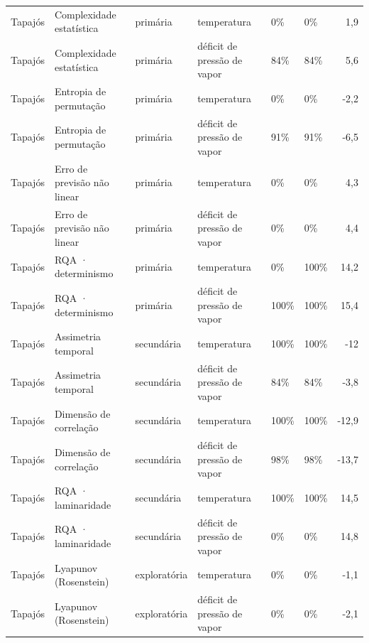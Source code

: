 \begin{table}
\begin{tabular}{llllllr}
Tapajós & Complexidade estatística & primária & temperatura & 0\% & 0\% & 1,9 \\
Tapajós & Complexidade estatística & primária & déficit de pressão de vapor & 84\% & 84\% & 5,6 \\
Tapajós & Entropia de permutação & primária & temperatura & 0\% & 0\% & -2,2 \\
Tapajós & Entropia de permutação & primária & déficit de pressão de vapor & 91\% & 91\% & -6,5 \\
Tapajós & Erro de previsão não linear & primária & temperatura & 0\% & 0\% & 4,3 \\
Tapajós & Erro de previsão não linear & primária & déficit de pressão de vapor & 0\% & 0\% & 4,4 \\
Tapajós & RQA · determinismo & primária & temperatura & 0\% & 100\% & 14,2 \\
Tapajós & RQA · determinismo & primária & déficit de pressão de vapor & 100\% & 100\% & 15,4 \\
Tapajós & Assimetria temporal & secundária & temperatura & 100\% & 100\% & -12 \\
Tapajós & Assimetria temporal & secundária & déficit de pressão de vapor & 84\% & 84\% & -3,8 \\
Tapajós & Dimensão de correlação & secundária & temperatura & 100\% & 100\% & -12,9 \\
Tapajós & Dimensão de correlação & secundária & déficit de pressão de vapor & 98\% & 98\% & -13,7 \\
Tapajós & RQA · laminaridade & secundária & temperatura & 100\% & 100\% & 14,5 \\
Tapajós & RQA · laminaridade & secundária & déficit de pressão de vapor & 0\% & 0\% & 14,8 \\
Tapajós & Lyapunov (Rosenstein) & exploratória & temperatura & 0\% & 0\% & -1,1 \\
Tapajós & Lyapunov (Rosenstein) & exploratória & déficit de pressão de vapor & 0\% & 0\% & -2,1 \\
\bottomrule
\end{tabular}
\end{table}
